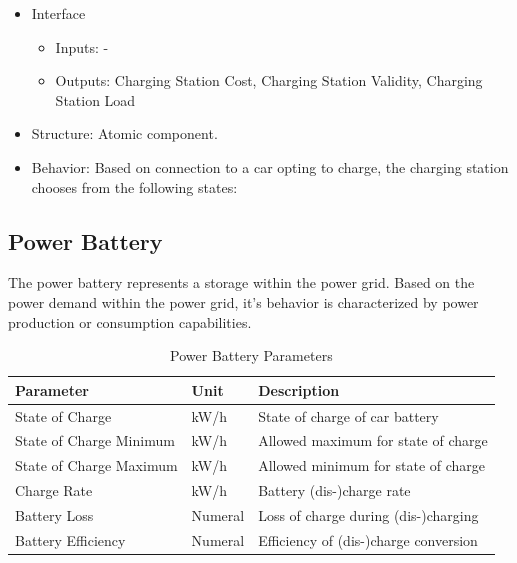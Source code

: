 \begin{itemize}
	\item Interface
			\begin{itemize}
				\item Inputs: -
				\item Outputs: Charging Station Cost, Charging Station Validity, Charging Station Load
			\end{itemize}	
	\item Structure: Atomic component.
	\item Behavior: Based on connection to a car opting to charge, the charging station chooses from the following states:
\end{itemize}

\subsection{Power Battery}
The power battery represents a storage within the power grid. Based on the power demand within the power grid, it's behavior is characterized by power production or consumption capabilities.

	 \begin{table}[h]
	 	\renewcommand{\arraystretch}{1.3}
	 	\caption{Power Battery Parameters}
	 	\centering
	 	\begin{tabular}{lll}
	 		\hline
	 		\textbf{Parameter}                    & \textbf{Unit} & \textbf{Description} \\ \hline
			State of Charge                       & kW/h          & State of charge of car battery                     \\
			State of Charge Minimum               & kW/h          & Allowed maximum for state of charge                    \\
			State of Charge Maximum               & kW/h          & Allowed minimum for state of charge                     \\
			Charge Rate                  	  	  & kW/h    	  & Battery (dis-)charge rate     \\ 
			Battery Loss                  	  	  & Numeral    	  & Loss of charge during (dis-)charging \\
			Battery Efficiency                    & Numeral    	  & Efficiency of (dis-)charge conversion     \\ \hline
	 	\end{tabular}
	 \end{table}

